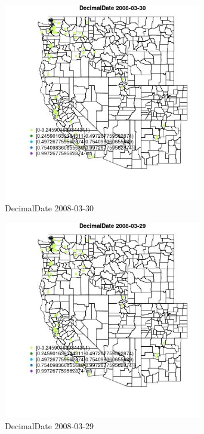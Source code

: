 \begin{figure} 
\centering  
\includegraphics[width=0.77\textwidth]{Code_Outputs/Report_ML_input_PM25_Step4_part_e_de_duplicated_aves_MapObsDecimalDate2008-03-30.jpg} 
\caption{\label{fig:Report_ML_input_PM25_Step4_part_e_de_duplicated_avesMapObsDecimalDate2008-03-30}DecimalDate 2008-03-30} 
\end{figure} 
 

\begin{figure} 
\centering  
\includegraphics[width=0.77\textwidth]{Code_Outputs/Report_ML_input_PM25_Step4_part_e_de_duplicated_aves_MapObsDecimalDate2008-03-29.jpg} 
\caption{\label{fig:Report_ML_input_PM25_Step4_part_e_de_duplicated_avesMapObsDecimalDate2008-03-29}DecimalDate 2008-03-29} 
\end{figure} 
 
